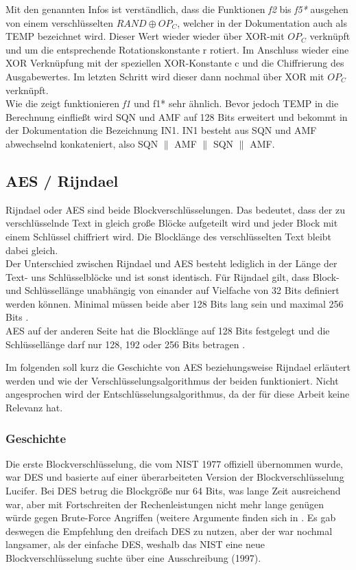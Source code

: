  Mit den genannten Infos ist verständlich, dass die Funktionen \emph{f2} bis \emph{f5*}
 ausgehen von einem verschlüsselten $RAND \oplus OP_{C}$, welcher in der Dokumentation
 auch als TEMP bezeichnet wird. Dieser Wert wieder wieder über XOR-mit $OP_ {C}$ verknüpft
 und um die entsprechende Rotationskonstante r rotiert. Im Anschluss wieder eine XOR
 Verknüpfung mit der speziellen XOR-Konstante c und die Chiffrierung des Ausgabewertes. Im
 letzten Schritt wird dieser dann nochmal über XOR mit $OP_{C}$ verknüpft. \\
 Wie die  zeigt funktionieren \emph{f1} und {f1*} sehr
 ähnlich. Bevor jedoch TEMP in die Berechnung einfließt wird SQN und AMF auf 128 Bits
 erweitert und bekommt in der Dokumentation die Bezeichnung IN1. IN1 besteht aus SQN und
 AMF abwechselnd konkateniert, also SQN $\|$ AMF $\|$ SQN $\|$ AMF. \cite{3gpp.33.102}
 
 
\subsection{AES / Rijndael}
\label{aes}
 Rijndael oder \ac{AES} sind beide Blockverschlüsselungen. Das bedeutet, dass der zu
 verschlüsselnde Text in gleich große Blöcke aufgeteilt wird und jeder Block mit einem Schlüssel
 chiffriert wird. Die Blocklänge des verschlüsselten Text bleibt dabei gleich. \\
 Der Unterschied zwischen Rijndael und AES besteht lediglich in der Länge der Text- uns
 Schlüsselblöcke und ist sonst identisch. Für Rijndael gilt, dass Block- und Schlüssellänge
 unabhängig von einander auf Vielfache von 32 Bits definiert werden können. Minimal müssen
 beide aber 128 Bits lang sein und maximal 256 Bits \cite{daemon02}. \\
 AES auf der anderen Seite hat die Blocklänge auf 128 Bits festgelegt und die Schlüssel\-länge
 darf nur 128, 192 oder 256 Bits betragen \cite{AES-FIPS}.
 
 Im folgenden soll kurz die Geschichte von AES beziehungsweise Rijndael erläutert werden und
 wie der Verschlüsselungs\-algorithmus der beiden funktioniert. Nicht angesprochen wird der
 Entschlüsselungs\-algorithmus, da der für diese Arbeit keine Relevanz hat.
 
 \subsubsection{Geschichte}
 \label{aes-geschichte}
 Die erste Blockverschlüsselung, die vom \ac{NIST} 1977 offiziell übernommen wurde, war
 \ac{DES} und basierte auf einer überarbeiteten Version der Blockverschlüsselung Lucifer. Bei
 DES betrug die Blockgröße nur 64 Bits, was lange Zeit ausreichend war, aber mit Fortschreiten
 der Rechenleistungen nicht mehr lange genügen würde gegen Brute-Force Angriffen (weitere
 Argumente finden sich in \cite{paar10}. Es gab deswegen die Empfehlung den dreifach DES zu
 nutzen, aber der war nochmal langsamer, als der einfache DES, weshalb das NIST eine neue
 Blockverschlüsselung suchte über eine Ausschreibung (1997).
 

